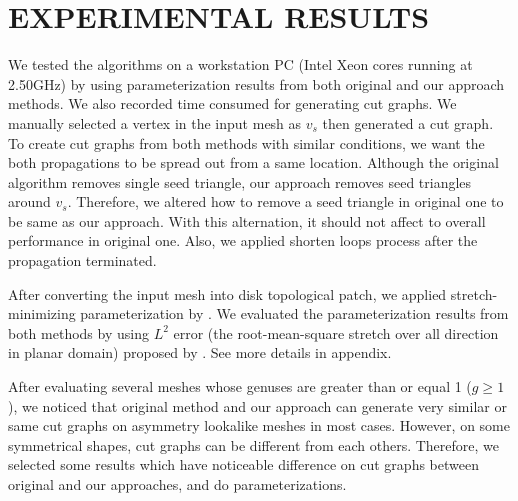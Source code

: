 \documentclass[a4paper,twoside]{article}
\begin{document}
\section{\uppercase{Experimental Results}}
\label{sec:Experiment Results}
\noindent We tested the algorithms on a workstation PC (Intel Xeon cores running at 2.50GHz) by using parameterization results from both original \cite{Gu:2002:GI:566654.566589} and our approach methods. We also recorded time consumed for generating cut graphs. We manually selected a vertex in the input mesh as $v_s$ then generated a cut graph. To create cut graphs from both methods with similar conditions, we want the both propagations to be spread out from a same location. Although the original algorithm removes single seed triangle, our approach removes seed triangles around $v_s$. Therefore, we altered how to remove a seed triangle in original one to be same as our approach. With this alternation, it should not affect to overall performance in original one. Also, we applied shorten loops process after the propagation terminated.

After converting the input mesh into disk topological patch, we applied stretch-minimizing parameterization by \cite{Yoshizawa_SMI04}.  We evaluated the parameterization results from both methods by using $L^2$ error (the root-mean-square stretch over all direction in planar domain) proposed by \cite{Sander:2001:TMP:383259.383307,Sander:2002:SP:581896.581909}. See more details in appendix.   

After evaluating several meshes whose genuses are greater than or equal 1 ($g \geq 1$), we noticed that original method and our approach can generate very similar or same cut graphs on asymmetry lookalike meshes in most cases. However, on some symmetrical shapes, cut graphs can be different from each others. Therefore, we selected some results which have noticeable difference on cut graphs between original and our approaches, and do parameterizations.
\end{document}

